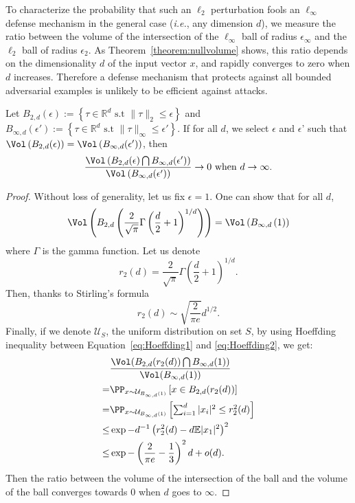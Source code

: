 To characterize the probability that such an  $\ell_2$ perturbation fools an $\ell_\infty$ defense mechanism in the general case (\emph{i.e.}, any dimension $d$), we measure the ratio between the volume of the intersection of the $\ell_\infty$ ball of radius $\epsilon_\infty$ and the $\ell_2$ ball of radius $\epsilon_2$. As Theorem~\ref{theorem:nullvolume} shows, this ratio depends on the dimensionality $d$ of the input vector $x$, and  rapidly converges to zero when $d$ increases. 
Therefore a defense mechanism that protects against all \linf bounded adversarial examples is unlikely to be efficient against \ltwo attacks. 


\begin{thm}
\label{theorem:nullvolume}
\noindent Let $B_{2,d}(\epsilon) :=\left \{\tau \in \mathbb{R}^d \text{ s.t } \lVert\tau\rVert_2 \leq  \epsilon \right \}$ and $B_{\infty,d}(\epsilon') :=\left \{\tau \in \mathbb{R}^d \text{ s.t } \lVert\tau\rVert_\infty \leq  \epsilon' \right\}$. If for all $d$, we select $\epsilon$ and $\epsilon$' such that $\Vol\left(B_{2,d}(\epsilon)\right) =\Vol\left(B_{\infty,d}(\epsilon')\right)$, then $$\frac{\Vol\left(B_{2,d}(\epsilon)\bigcap B_{\infty,d}(\epsilon')\right)}{\Vol\left(B_{\infty,d}(\epsilon')\right)} \rightarrow 0 \text{ when } d\rightarrow \infty. $$
\end{thm} 
\begin{proof} 
Without loss of generality, let us fix $\epsilon=1$. One can show that for all $d$, 
\begin{equation}
    \Vol\left( B_{2,d}\left(\frac{2}{\sqrt{\pi}}\Gamma\left(\frac{d}{2}+1\right)^{1/d}\right)\right) = \Vol\left(B_{\infty,d}\left(1\right)\right)
\end{equation}
where $\Gamma$ is the gamma function. Let us denote 
\begin{equation}
    r_2(d)=\frac{2}{\sqrt{\pi}}\Gamma\left(\frac{d}{2}+1\right)^{1/d}.
\end{equation}
Then, thanks to Stirling's formula
\begin{equation}
    r_2(d)\sim \sqrt{\frac{2}{\pi e}} d^{1/2}.
\end{equation}
Finally, if we denote $\mathcal{U}_S$, the uniform distribution on set $S$, by using  Hoeffding inequality between Equation~\ref{eq:Hoeffding1} and \ref{eq:Hoeffding2}, we get:
\begin{align}
&\frac{\Vol(B_{2,d}(r_2(d))\bigcap B_{\infty,d}(1))}{\Vol(B_{\infty,d}(1))} \\
=&\PP_{x\sim \mathcal{U}_{B_{\infty,d}(1)}}\left[x\in B_{2,d}(r_2(d))\right] \\
=&\PP_{x\sim \mathcal{U}_{B_{\infty,d}(1)}}\left[\textstyle \sum_{i=1}^d |x_i|^2\leq r_2^2(d)\right] \\
\leq &\exp{- d^{-1} \left( r_2^2(d)-d\mathbb{E}|x_1|^2\right)^2} \label{eq:Hoeffding1} \\
\leq &\exp{-\left( \frac{2}{\pi e}-\frac13\right)^2d+ o(d)} \label{eq:Hoeffding2}.
\end{align}
\noindent
Then the ratio between the volume of the intersection of the ball and the volume of the ball converges towards $0$ when $d$ goes to $\infty$.
\end{proof}

